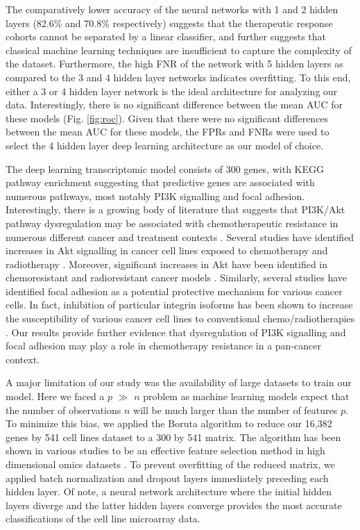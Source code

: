 \documentclass[10pt, letterpaper]{article}
\begin{document}
\begin{multicols*}{2}
The comparatively lower accuracy of the neural networks with 1 and 2 hidden layers (82.6\% and 70.8\% respectively) suggests that the therapeutic response cohorts cannot be separated by a linear classifier, and further suggests that classical machine learning techniques are insufficient to capture the complexity of the dataset. Furthermore, the high FNR of the network with 5 hidden layers as compared to the 3 and 4 hidden layer networks indicates overfitting. To this end, either a 3 or 4 hidden layer network is the ideal architecture for analyzing our data. Interestingly, there is no significant difference between the mean AUC for these models (Fig. \ref{fig:roc}). Given that there were no significant differences between the mean AUC for these models, the FPRs and FNRs were used to select the 4 hidden layer deep learning architecture as our model of choice.

The deep learning transcriptomic model consists of 300 genes, with KEGG pathway enrichment suggesting that predictive genes are associated with numerous pathways, most notably PI3K signalling and focal adhesion. Interestingly, there is a growing body of literature that suggests that PI3K/Akt pathway dysregulation may be associated with chemotherapeutic resistance in numerous different cancer and treatment contexts \cite{huang_2009}. Several studies have identified increases in Akt signalling in cancer cell lines exposed to chemotherapy and radiotherapy \cite{mapk, wort, phos}. Moreover, significant increases in Akt have been identified in chemoresistant and radioresistant cancer models \cite{cholangio}. Similarly, several studies have identified focal adhesion as a potential protective mechanism for various cancer cells. In fact, inhibition of particular integrin isoforms has been shown to increase the susceptibility of various cancer cell lines to conventional chemo/radiotherapies \cite{focal_adhesion}. Our results provide further evidence that dysregulation of PI3K signalling and focal adhesion may play a role in chemotherapy resistance in a pan-cancer context.

A major limitation of our study was the availability of large datasets to train our model. Here we faced a $p$ $\gg$ $n$ problem as machine learning models expect that the number of observations $n$ will be much larger than the number of features $p$. To minimize this bias, we applied the Boruta algorithm to reduce our 16,382 genes by 541 cell lines dataset to a 300 by 541 matrix. The algorithm has been shown in various studies to be an effective feature selection method in high dimensional omics datasets \cite{boruta}. To prevent overfitting of the reduced matrix, we applied batch normalization and dropout layers immediately preceding each hidden layer. Of note, a neural network architecture where the initial hidden layers diverge and the latter hidden layers converge provides the most accurate classifications of the cell line microarray data.


\end{multicols*}
\end{document}
